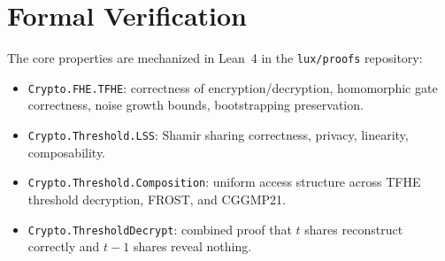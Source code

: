 \section{Formal Verification}

\label{sec:formal}

The core properties are mechanized in Lean~4 in the
\texttt{lux/proofs} repository:

\begin{itemize}[nosep]
  \item \texttt{Crypto.FHE.TFHE}: correctness of encryption/decryption,
        homomorphic gate correctness, noise growth bounds, bootstrapping
        preservation.
  \item \texttt{Crypto.Threshold.LSS}: Shamir sharing correctness,
        privacy, linearity, composability.
  \item \texttt{Crypto.Threshold.Composition}: uniform access structure
        across TFHE threshold decryption, FROST, and CGGMP21.
  \item \texttt{Crypto.ThresholdDecrypt}: combined proof that $t$
        shares reconstruct correctly and $t{-}1$ shares reveal nothing.
\end{itemize}

